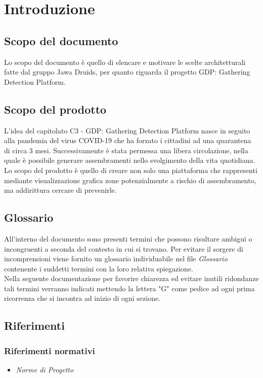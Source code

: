 \chapter{Introduzione}

\section{Scopo del documento}
Lo scopo del documento è quello di elencare e motivare le scelte architetturali fatte dal gruppo Jawa Druids, per quanto riguarda il progetto GDP: Gathering Detection Platform. 
\section{Scopo del prodotto}
L'idea del capitolato C3 - GDP: Gathering Detection Platform nasce in seguito alla pandemia del virus COVID-19 che ha forzato i cittadini ad una quarantena di circa 3 mesi. Successivamente è stata permessa una libera circolazione, nella quale è possibile generare assembramenti nello svolgimento della vita quotidiana. Lo scopo del prodotto è quello di creare non solo una piattaforma che rappresenti mediante visualizzazione grafica zone potenzialmente a rischio di assembramento, ma addirittura cercare di prevenirle.  
\section{Glossario}
All'interno del documento sono presenti termini che possono risultare ambigui o incongruenti a seconda del contesto in cui si trovano. Per evitare il sorgere di incomprensioni viene fornito un glossario individuabile nel file \textit{Glossario} contenente i suddetti termini con la loro relativa spiegazione.
\\Nella seguente documentazione per favorire chiarezza ed evitare inutili ridondanze tali termini verranno indicati mettendo la lettera "G" come pedice ad ogni prima ricorrenza che si incontra ad inizio di ogni sezione.

\section{Riferimenti}
\subsection{Riferimenti normativi}
\begin{itemize}
	\item \textit{Norme di Progetto}
\end{itemize}
